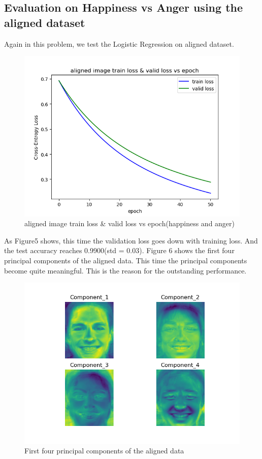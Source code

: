 \documentclass{article} %
\begin{document}
\subsection {Evaluation on Happiness vs Anger using the aligned dataset}
Again in this problem, we test the Logistic Regression on aligned dataset.
\begin{figure}[h]
	\centering
	\includegraphics[scale=0.5]{./graph/aligned_tvloss.png}
	\caption{aligned image train loss \& valid loss vs epoch(happiness and anger)}
\end{figure}
As Figure5 shows, this time the validation loss goes down with training loss. And the test accuracy reaches 0.9900(std = 0.03). Figure 6 shows the first four principal components of the aligned data. This time the principal components become quite meaningful. This is the reason for the outstanding performance.
\begin{figure}[h]
	\centering
	\includegraphics[scale=0.5]{./graph/pca_aligned.png}
	\caption{First four principal components of the aligned data}
\end{figure}
\end{document}
